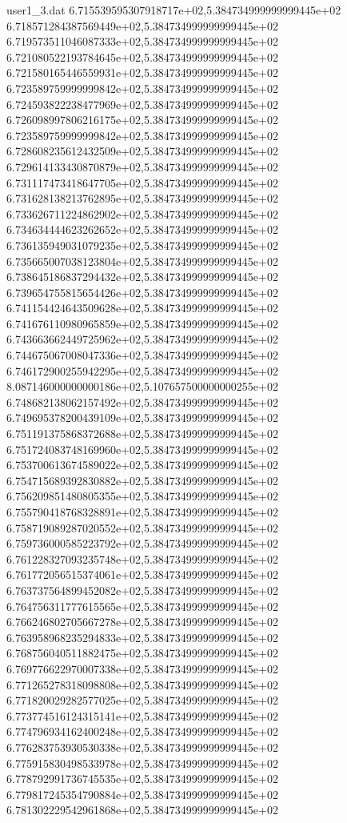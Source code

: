\begin{filecontents}{user1_3.dat}
6.715539595307918717e+02,5.384734999999999445e+02
6.718571284387569449e+02,5.384734999999999445e+02
6.719573511046087333e+02,5.384734999999999445e+02
6.721080522193784645e+02,5.384734999999999445e+02
6.721580165446559931e+02,5.384734999999999445e+02
6.723589759999999842e+02,5.384734999999999445e+02
6.724593822238477969e+02,5.384734999999999445e+02
6.726098997806216175e+02,5.384734999999999445e+02
6.723589759999999842e+02,5.384734999999999445e+02
6.728608235612432509e+02,5.384734999999999445e+02
6.729614133430870879e+02,5.384734999999999445e+02
6.731117473418647705e+02,5.384734999999999445e+02
6.731628138213762895e+02,5.384734999999999445e+02
6.733626711224862902e+02,5.384734999999999445e+02
6.734634444623262652e+02,5.384734999999999445e+02
6.736135949031079235e+02,5.384734999999999445e+02
6.735665007038123804e+02,5.384734999999999445e+02
6.738645186837294432e+02,5.384734999999999445e+02
6.739654755815654426e+02,5.384734999999999445e+02
6.741154424643509628e+02,5.384734999999999445e+02
6.741676110980965859e+02,5.384734999999999445e+02
6.743663662449725962e+02,5.384734999999999445e+02
6.744675067008047336e+02,5.384734999999999445e+02
6.746172900255942295e+02,5.384734999999999445e+02
8.087146000000000186e+02,5.107657500000000255e+02
6.748682138062157492e+02,5.384734999999999445e+02
6.749695378200439109e+02,5.384734999999999445e+02
6.751191375868372688e+02,5.384734999999999445e+02
6.751724083748169960e+02,5.384734999999999445e+02
6.753700613674589022e+02,5.384734999999999445e+02
6.754715689392830882e+02,5.384734999999999445e+02
6.756209851480805355e+02,5.384734999999999445e+02
6.755790418768328891e+02,5.384734999999999445e+02
6.758719089287020552e+02,5.384734999999999445e+02
6.759736000585223792e+02,5.384734999999999445e+02
6.761228327093235748e+02,5.384734999999999445e+02
6.761772056515374061e+02,5.384734999999999445e+02
6.763737564899452082e+02,5.384734999999999445e+02
6.764756311777615565e+02,5.384734999999999445e+02
6.766246802705667278e+02,5.384734999999999445e+02
6.763958968235294833e+02,5.384734999999999445e+02
6.768756040511882475e+02,5.384734999999999445e+02
6.769776622970007338e+02,5.384734999999999445e+02
6.771265278318098808e+02,5.384734999999999445e+02
6.771820029282577025e+02,5.384734999999999445e+02
6.773774516124315141e+02,5.384734999999999445e+02
6.774796934162400248e+02,5.384734999999999445e+02
6.776283753930530338e+02,5.384734999999999445e+02
6.775915830498533978e+02,5.384734999999999445e+02
6.778792991736745535e+02,5.384734999999999445e+02
6.779817245354790884e+02,5.384734999999999445e+02
6.781302229542961868e+02,5.384734999999999445e+02

\end{filecontents}
